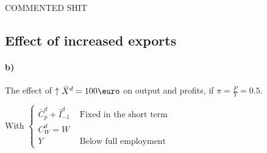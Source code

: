 \documentclass{report}
\begin{document}
COMMENTED SHIT


\subsection{Effect of increased exports}

\paragraph{b)} The effect of $\uparrow \bar{X}^d=100\text{\euro}$ on output and profits, if $\pi=\frac{P}{Y}=0.5$.

With $\left\{\begin{array}{cc}
      \bar{C}^d_p+\bar{I}^d_{-1} & \text{ Fixed in the short term}\\
      C^d_W=W \\
      Y & \text{ Below full employment}
\end{array}\right.$
\end{document}
